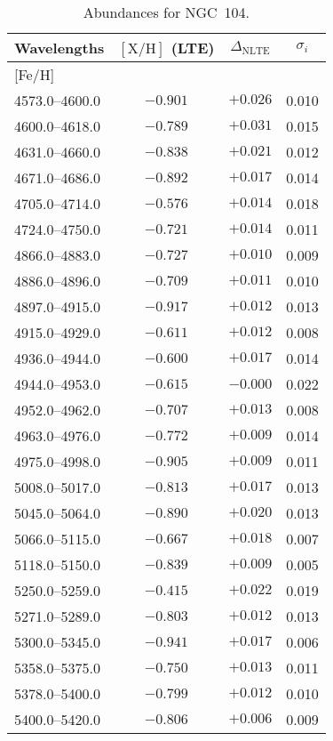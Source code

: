 \documentclass{aa}
\begin{document}
\begin{appendix}
\begin{table}
\caption{Abundances for NGC~104.}
{\tiny
\begin{tabular}{lccc} \\ \hline\hline
Wavelengths & $\mathrm{[X/H]}$ (LTE) & $\Delta_\mathrm{NLTE}$ & $\sigma_i$ \\ \hline
% 
\mbox{[Fe/H]} \\
4573.0--4600.0 & $-0.901$ & $+0.026$ & 0.010 \\
4600.0--4618.0 & $-0.789$ & $+0.031$ & 0.015 \\
4631.0--4660.0 & $-0.838$ & $+0.021$ & 0.012 \\
4671.0--4686.0 & $-0.892$ & $+0.017$ & 0.014 \\
4705.0--4714.0 & $-0.576$ & $+0.014$ & 0.018 \\
4724.0--4750.0 & $-0.721$ & $+0.014$ & 0.011 \\
4866.0--4883.0 & $-0.727$ & $+0.010$ & 0.009 \\
4886.0--4896.0 & $-0.709$ & $+0.011$ & 0.010 \\
4897.0--4915.0 & $-0.917$ & $+0.012$ & 0.013 \\
4915.0--4929.0 & $-0.611$ & $+0.012$ & 0.008 \\
4936.0--4944.0 & $-0.600$ & $+0.017$ & 0.014 \\
4944.0--4953.0 & $-0.615$ & $-0.000$ & 0.022 \\
4952.0--4962.0 & $-0.707$ & $+0.013$ & 0.008 \\
4963.0--4976.0 & $-0.772$ & $+0.009$ & 0.014 \\
4975.0--4998.0 & $-0.905$ & $+0.009$ & 0.011 \\
5008.0--5017.0 & $-0.813$ & $+0.017$ & 0.013 \\
5045.0--5064.0 & $-0.890$ & $+0.020$ & 0.013 \\
5066.0--5115.0 & $-0.667$ & $+0.018$ & 0.007 \\
5118.0--5150.0 & $-0.839$ & $+0.009$ & 0.005 \\
5250.0--5259.0 & $-0.415$ & $+0.022$ & 0.019 \\
5271.0--5289.0 & $-0.803$ & $+0.012$ & 0.013 \\
5300.0--5345.0 & $-0.941$ & $+0.017$ & 0.006 \\
5358.0--5375.0 & $-0.750$ & $+0.013$ & 0.011 \\
5378.0--5400.0 & $-0.799$ & $+0.012$ & 0.010 \\
5400.0--5420.0 & $-0.806$ & $+0.006$ & 0.009 \\

\end{tabular}}
\end{table}
\end{appendix}
\end{document}
